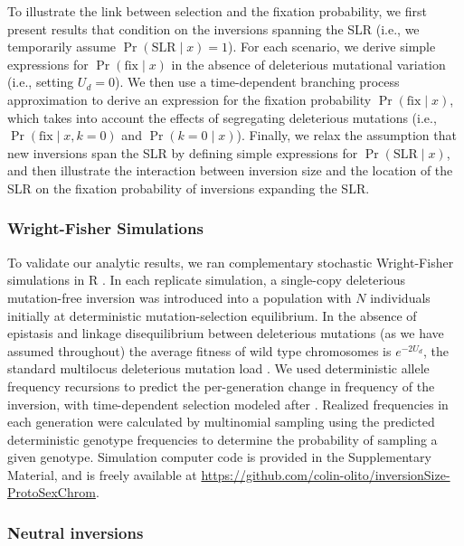\documentclass{article}[12pt]
\begin{document}
To illustrate the link between selection and the fixation probability, we first present results that condition on the inversions spanning the SLR (i.e., we temporarily assume $\Pr(\text{SLR} \mid x) = 1$). For each scenario, we derive simple expressions for $\Pr(\text{fix} \mid x)$ in the absence of deleterious mutational variation (i.e., setting $U_d = 0$). We then use a time-dependent branching process approximation to derive an expression for the fixation probability $\Pr(\text{fix} \mid x)$, which takes into account the effects of segregating deleterious mutations (i.e., $\Pr(\text{fix} \mid x, k=0)$ and $\Pr(k=0 \mid x)$). Finally, we relax the assumption that new inversions span the SLR by defining simple expressions for $\Pr(\text{SLR} \mid x)$, and then illustrate the interaction between inversion size and the location of the SLR on the fixation probability of inversions expanding the SLR.


\subsubsection*{Wright-Fisher Simulations}

To validate our analytic results, we ran complementary stochastic Wright-Fisher simulations in R \citep{RSoftware}. In each replicate simulation, a single-copy deleterious mutation-free inversion was introduced into a population with $N$ individuals initially at deterministic mutation-selection equilibrium. In the absence of epistasis and linkage disequilibrium between deleterious mutations (as we have assumed throughout) the average fitness of wild type chromosomes is $e^{-2 U_d}$, the standard multilocus deleterious mutation load \citep{Haldane1937,AgrawalWhitlock2012}. We used deterministic allele frequency recursions to predict the per-generation change in frequency of the inversion, with time-dependent selection modeled after \citet{Nei1967}. Realized frequencies in each generation were calculated by multinomial sampling using the predicted deterministic genotype frequencies to determine the probability of sampling a given genotype. Simulation computer code is provided in the Supplementary Material, and is freely available at  \url{https://github.com/colin-olito/inversionSize-ProtoSexChrom}.

\subsubsection*{Neutral inversions}
\end{document}
